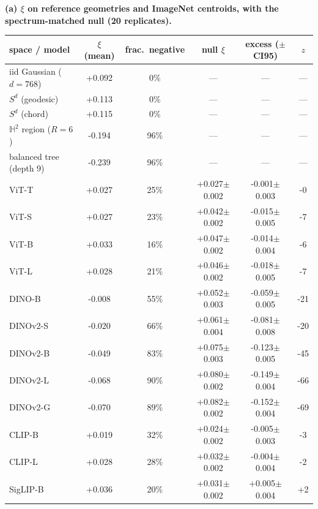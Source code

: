 \begin{table}[H]
\centering
\footnotesize
\setlength{\tabcolsep}{4pt}
\noindent\textbf{(a) $\xi$ on reference geometries and ImageNet centroids, with the spectrum-matched null (20 replicates).}\par\vspace{1.5pt}
\begin{tabular}{lccccc}
\toprule
space / model & $\xi$ (mean) & frac.\ negative & null $\xi$ & excess ($\pm$CI95) & $z$ \\
\midrule
iid Gaussian ($d{=}768$) & +0.092 & 0\% & --- & --- & --- \\
$S^{d}$ (geodesic) & +0.113 & 0\% & --- & --- & --- \\
$S^{d}$ (chord) & +0.115 & 0\% & --- & --- & --- \\
\midrule
$\mathbb{H}^2$ region ($R{=}6$) & -0.194 & 96\% & --- & --- & --- \\
balanced tree (depth 9) & -0.239 & 96\% & --- & --- & --- \\
ViT-T & +0.027 & 25\% & +0.027$\pm$0.002 & -0.001$\pm$0.003 & -0 \\
ViT-S & +0.027 & 23\% & +0.042$\pm$0.002 & -0.015$\pm$0.005 & -7 \\
ViT-B & +0.033 & 16\% & +0.047$\pm$0.002 & -0.014$\pm$0.004 & -6 \\
ViT-L & +0.028 & 21\% & +0.046$\pm$0.002 & -0.018$\pm$0.005 & -7 \\
DINO-B & -0.008 & 55\% & +0.052$\pm$0.003 & -0.059$\pm$0.005 & -21 \\
DINOv2-S & -0.020 & 66\% & +0.061$\pm$0.004 & -0.081$\pm$0.008 & -20 \\
DINOv2-B & -0.049 & 83\% & +0.075$\pm$0.003 & -0.123$\pm$0.005 & -45 \\
DINOv2-L & -0.068 & 90\% & +0.080$\pm$0.002 & -0.149$\pm$0.004 & -66 \\
DINOv2-G & -0.070 & 89\% & +0.082$\pm$0.002 & -0.152$\pm$0.004 & -69 \\
CLIP-B & +0.019 & 32\% & +0.024$\pm$0.002 & -0.005$\pm$0.003 & -3 \\
CLIP-L & +0.028 & 28\% & +0.032$\pm$0.002 & -0.004$\pm$0.004 & -2 \\
SigLIP-B & +0.036 & 20\% & +0.031$\pm$0.002 & +0.005$\pm$0.004 & +2 \\
\bottomrule
\end{tabular}
\par\vspace{5pt}

\end{table}
